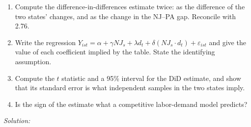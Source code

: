 \documentclass[11pt,a4paper]{article}
\newif\ifsolucoes
\newcommand{\espacoresol}{4.5cm}   %
\newcommand{\resolespaco}{\ifsolucoes\else\par\textit{Solution:}\vspace{\espacoresol}\par\fi}
\begin{document}
\begin{enumerate}[label=(\alph*)]
\item Compute the difference-in-differences estimate twice: as the difference of the two states' changes,
and as the change in the NJ--PA gap. Reconcile with 2.76.
\item Write the regression $Y_{ist}=\alpha+\gamma NJ_s+\lambda d_t+\delta(NJ_s\cdot d_t)+\varepsilon_{ist}$ and
give the value of each coefficient implied by the table. State the identifying assumption.
\item Compute the $t$ statistic and a 95\% interval for the DiD estimate, and show that its standard
error is what independent samples in the two states imply.
\item Is the sign of the estimate what a competitive labor-demand model predicts?
\end{enumerate}
\resolespaco
\end{document}
